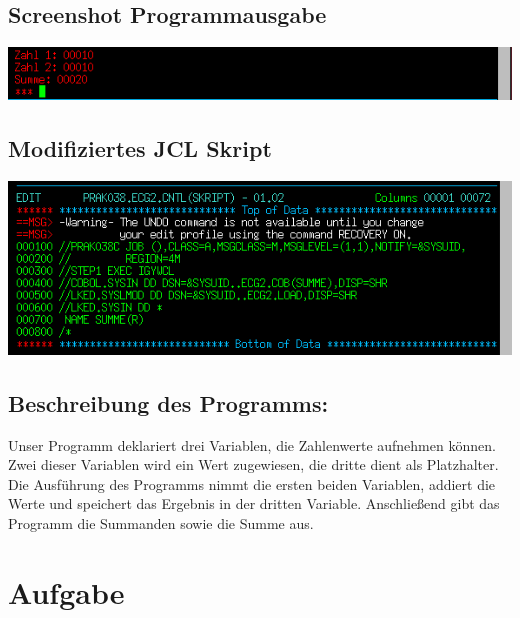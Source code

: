 \documentclass[a4paper]{scrartcl}
\begin{document}
	\subsection{Screenshot Programmausgabe}
	\includegraphics{screenshots/2_cobol_output.png}
	
	\subsection{Modifiziertes JCL Skript}
	\includegraphics{screenshots/2_jcl_script.png}
	
	
	\subsection{Beschreibung des Programms:} 
	
	Unser Programm deklariert drei Variablen, die Zahlenwerte aufnehmen können. Zwei dieser Variablen wird ein Wert zugewiesen, die dritte dient als Platzhalter.\\
	Die Ausführung des Programms nimmt die ersten beiden Variablen, addiert die Werte und speichert das Ergebnis in der dritten Variable. Anschließend gibt das Programm die Summanden sowie die Summe aus.
	
	
	
	\section{Aufgabe}
\end{document}
